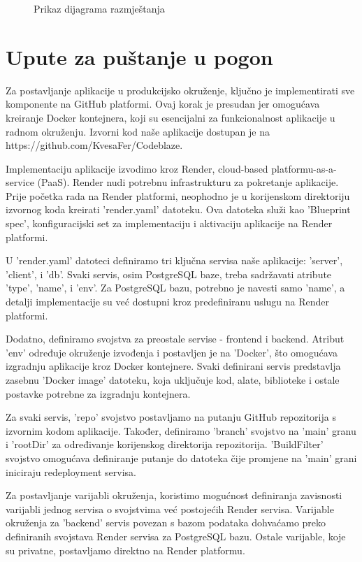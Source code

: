 \begin{figure} [H]
	        \centering
	        \caption{Prikaz dijagrama razmještanja}
	        \label{fig:Prikaz dijagrama razmještanja}
        \end{figure}

			\eject 
		
		\section{Upute za puštanje u pogon}

		Za postavljanje aplikacije u produkcijsko okruženje, ključno je implementirati sve komponente na GitHub platformi. Ovaj korak je presudan jer omogućava kreiranje Docker kontejnera, koji su esencijalni za funkcionalnost aplikacije u radnom okruženju. Izvorni kod naše aplikacije dostupan je na https://github.com/KvesaFer/Codeblaze.

		Implementaciju aplikacije izvodimo kroz Render, cloud-based platformu-as-a-service (PaaS). Render nudi potrebnu infrastrukturu za pokretanje aplikacije. Prije početka rada na Render platformi, neophodno je u korijenskom direktoriju izvornog koda kreirati 'render.yaml' datoteku. Ova datoteka služi kao 'Blueprint spec', konfiguracijski set za implementaciju i aktivaciju aplikacije na Render platformi.

		U 'render.yaml' datoteci definiramo tri ključna servisa naše aplikacije: 'server', 'client', i 'db'. Svaki servis, osim PostgreSQL baze, treba sadržavati atribute 'type', 'name', i 'env'. Za PostgreSQL bazu, potrebno je navesti samo 'name', a detalji implementacije su već dostupni kroz predefiniranu uslugu na Render platformi.

		Dodatno, definiramo svojstva za preostale servise - frontend i backend. Atribut 'env' određuje okruženje izvođenja i postavljen je na 'Docker', što omogućava izgradnju aplikacije kroz Docker kontejnere. Svaki definirani servis predstavlja zasebnu 'Docker image' datoteku, koja uključuje kod, alate, biblioteke i ostale postavke potrebne za izgradnju kontejnera.

		Za svaki servis, 'repo' svojstvo postavljamo na putanju GitHub repozitorija s izvornim kodom aplikacije. Također, definiramo 'branch' svojstvo na 'main' granu i 'rootDir' za određivanje korijenskog direktorija repozitorija. 'BuildFilter' svojstvo omogućava definiranje putanje do datoteka čije promjene na 'main' grani iniciraju redeployment servisa.

		Za postavljanje varijabli okruženja, koristimo mogućnost definiranja zavisnosti varijabli jednog servisa o svojstvima već postojećih Render servisa. Varijable okruženja za 'backend' servis povezan s bazom podataka dohvaćamo preko definiranih svojstava Render servisa za PostgreSQL bazu. Ostale varijable, koje su privatne, postavljamo direktno na Render platformu.

